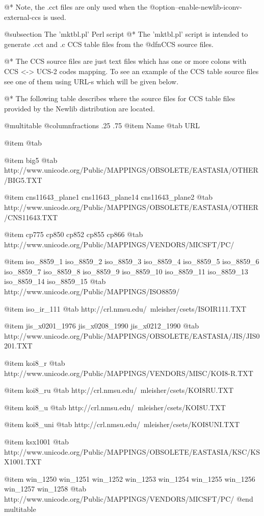 @*
Note, the .cct files are only used when the
@option{--enable-newlib-iconv-external-ccs} is used.

@subsection The 'mktbl.pl' Perl script
@*
The 'mktbl.pl' script is intended to generate .cct and .c CCS table
files from the @dfn{CCS source files}.

@*
The CCS source files are just text files which has one or more colons
with CCS <-> UCS-2 codes mapping. To see an example of the CCS table
source files see one of them using URL-s which will be given below.

@*
The following table describes where the source files for CCS table files
provided by the Newlib distribution are located.

@multitable @columnfractions .25 .75
@item
Name
@tab
URL

@item
@tab

@item
big5
@tab
http://www.unicode.org/Public/MAPPINGS/OBSOLETE/EASTASIA/OTHER/BIG5.TXT

@item
cns11643_plane1
cns11643_plane14
cns11643_plane2
@tab
http://www.unicode.org/Public/MAPPINGS/OBSOLETE/EASTASIA/OTHER/CNS11643.TXT

@item
cp775
cp850
cp852
cp855
cp866
@tab
http://www.unicode.org/Public/MAPPINGS/VENDORS/MICSFT/PC/

@item
iso_8859_1
iso_8859_2
iso_8859_3
iso_8859_4
iso_8859_5
iso_8859_6
iso_8859_7
iso_8859_8
iso_8859_9
iso_8859_10
iso_8859_11
iso_8859_13
iso_8859_14
iso_8859_15
@tab
http://www.unicode.org/Public/MAPPINGS/ISO8859/

@item
iso_ir_111
@tab
http://crl.nmsu.edu/~mleisher/csets/ISOIR111.TXT

@item
jis_x0201_1976
jis_x0208_1990
jis_x0212_1990
@tab
http://www.unicode.org/Public/MAPPINGS/OBSOLETE/EASTASIA/JIS/JIS0201.TXT

@item
koi8_r
@tab
http://www.unicode.org/Public/MAPPINGS/VENDORS/MISC/KOI8-R.TXT

@item
koi8_ru
@tab
http://crl.nmsu.edu/~mleisher/csets/KOI8RU.TXT

@item
koi8_u
@tab
http://crl.nmsu.edu/~mleisher/csets/KOI8U.TXT

@item
koi8_uni
@tab
http://crl.nmsu.edu/~mleisher/csets/KOI8UNI.TXT

@item
ksx1001
@tab
http://www.unicode.org/Public/MAPPINGS/OBSOLETE/EASTASIA/KSC/KSX1001.TXT

@item
win_1250
win_1251
win_1252
win_1253
win_1254
win_1255
win_1256
win_1257
win_1258
@tab
http://www.unicode.org/Public/MAPPINGS/VENDORS/MICSFT/PC/
@end multitable

